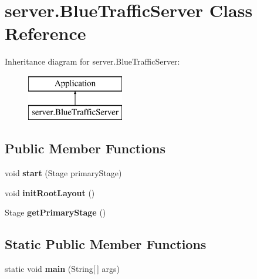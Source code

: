 \hypertarget{classserver_1_1_blue_traffic_server}{}\section{server.\+Blue\+Traffic\+Server Class Reference}
\label{classserver_1_1_blue_traffic_server}
Inheritance diagram for server.\+Blue\+Traffic\+Server\+:\begin{figure}[H]
\begin{center}
\leavevmode
\includegraphics[height=2.000000cm]{classserver_1_1_blue_traffic_server}
\end{center}
\end{figure}
\subsection*{Public Member Functions}
\begin{DoxyCompactItemize}
\item 
void {\bfseries start} (Stage primary\+Stage)\hypertarget{classserver_1_1_blue_traffic_server_a1724087b3c6ced2eb2e1ee84a4742a86}{}\label{classserver_1_1_blue_traffic_server_a1724087b3c6ced2eb2e1ee84a4742a86}

\item 
void {\bfseries init\+Root\+Layout} ()\hypertarget{classserver_1_1_blue_traffic_server_abaa84b680468bf1082782caf8c37d69b}{}\label{classserver_1_1_blue_traffic_server_abaa84b680468bf1082782caf8c37d69b}

\item 
Stage {\bfseries get\+Primary\+Stage} ()\hypertarget{classserver_1_1_blue_traffic_server_a740436c1e9bde88ce9e0f8674a07e7d9}{}\label{classserver_1_1_blue_traffic_server_a740436c1e9bde88ce9e0f8674a07e7d9}

\end{DoxyCompactItemize}
\subsection*{Static Public Member Functions}
\begin{DoxyCompactItemize}
\item 
static void {\bfseries main} (String\mbox{[}$\,$\mbox{]} args)\hypertarget{classserver_1_1_blue_traffic_server_a636d434bdf3fc0615700bcbe65b7a7d8}{}\label{classserver_1_1_blue_traffic_server_a636d434bdf3fc0615700bcbe65b7a7d8}

\end{DoxyCompactItemize}


